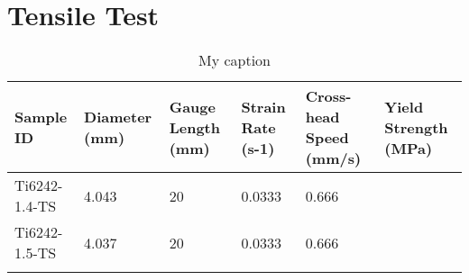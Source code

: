\newpage
\renewcommand{\workingDate}{\textsc{2017 $|$ September $|$ 13}}

\section{Tensile Test}

\begin{table}[]
\centering
\caption{My caption}
\label{my-label}
\begin{tabular}{llllll}
\hline
\textbf{Sample ID} & \textbf{Diameter (mm)} & \textbf{Gauge Length (mm)} & \textbf{Strain Rate (s-1)} & \textbf{Cross-head Speed (mm/s)} & \textbf{Yield Strength (MPa)} \\ \hline
Ti6242-1.4-TS      & 4.043                  & 20                         & 0.0333                     & 0.666                            &                               \\
Ti6242-1.5-TS      & 4.037                  & 20                         & 0.0333                     & 0.666                            &                               \\
                   &                        &                            &                            &                                  &                              
\end{tabular}
\end{table}